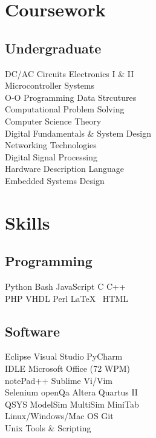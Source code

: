\documentclass[]{deedy-resume-openfont}
\begin{document}
\begin{minipage}[t]{0.32\textwidth}
\section{Coursework}
\subsection{Undergraduate}
DC/AC Circuits \textbullet{} Electronics I \& II \\
Microcontroller Systems \\
O-O Programming \textbullet{} Data Strcutures \\
Computational Problem Solving \\
Computer Science Theory \\
Digital Fundamentals \& System Design\\
Networking Technologies\\
Digital Signal Processing\\
Hardware Description Language\\
Embedded Systems Design
\sectionsep


\section{Skills}
\subsection{Programming}
Python \textbullet{} Bash \textbullet{} JavaScript \textbullet{} C \textbullet{} C++ \\
PHP \textbullet{} VHDL \textbullet{} Perl \textbullet{} \LaTeX\ \textbullet{} HTML 
\sectionsep

\subsection{Software}
Eclipse \textbullet{} Visual Studio \textbullet{} PyCharm \\ IDLE \textbullet{} Microsoft Office (72 WPM) \\ notePad++ \textbullet{} Sublime \textbullet{} Vi/Vim \\ Selenium \textbullet{} openQa \textbullet{} Altera Quartus II \\ QSYS \textbullet{} ModelSim \textbullet{} MultiSim \textbullet{} MiniTab \\ Linux/Windows/Mac OS \textbullet{} Git \\ Unix Tools \& Scripting
\sectionsep


\end{minipage}
\end{document}
